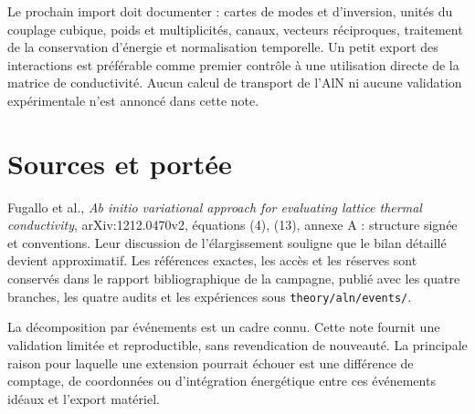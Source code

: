 \documentclass[11pt,a4paper]{article}
\begin{document}
Le prochain import doit documenter : cartes de modes et d'inversion,
unités du couplage cubique, poids et multiplicités, canaux, vecteurs
réciproques, traitement de la conservation d'énergie et normalisation
temporelle. Un petit export des interactions est préférable comme
premier contrôle à une utilisation directe de la matrice de conductivité.
Aucun calcul de transport de l'AlN ni aucune validation expérimentale
n'est annoncé dans cette note.

\section{Sources et portée}
Fugallo et al., \emph{Ab initio variational approach for evaluating lattice
thermal conductivity}, arXiv:1212.0470v2, équations (4), (13), annexe A :
structure signée et conventions. Leur discussion de l'élargissement
souligne que le bilan détaillé devient approximatif.
Les références exactes, les accès et les réserves sont conservés dans
le rapport bibliographique de la campagne, publié avec les quatre branches,
les quatre audits et les expériences sous
\texttt{theory/aln/events/}.

La décomposition par événements est un cadre connu. Cette note fournit
une validation limitée et reproductible, sans revendication de nouveauté.
La principale raison pour laquelle une extension pourrait échouer est
une différence de comptage, de coordonnées ou d'intégration énergétique
entre ces événements idéaux et l'export matériel.
\end{document}
